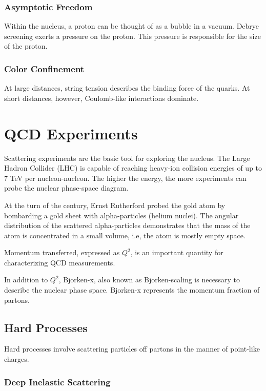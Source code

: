 \subsubsection{Asymptotic Freedom}

Within the nucleus, a proton can be thought of as a bubble in a vacuum. Debrye screening exerts a pressure on the proton. This pressure is responsible for the size of the proton. 

\subsubsection{Color Confinement} 

At large distances, string tension describes the binding force of the quarks. At short distances, however, Coulomb-like interactions dominate.

\section{QCD Experiments}

Scattering experiments are the basic tool for exploring the nucleus. The Large Hadron Collider (LHC) is capable of reaching heavy-ion collision energies of up to 7 TeV per nucleon-nucleon. The higher the energy, the more experiments can probe the nuclear phase-space diagram.

At the turn of the century, Ernst Rutherford probed the gold atom by bombarding a gold sheet with alpha-particles (helium nuclei). The angular distribution of the scattered alpha-particles demonstrates that the mass of the atom is concentrated in a small volume, i.e, the atom is mostly empty space. 

Momentum transferred, expressed as $Q^2$, is an important quantity for characterizing QCD measurements. 

In addition to $Q^2$, Bjorken-x, also known as Bjorken-scaling is necessary to describe the nuclear phase space. Bjorken-x represents the momentum fraction of partons. 

\subsection{Hard Processes}

Hard processes involve scattering particles off partons in the manner of point-like charges.

\subsubsection{Deep Inelastic Scattering}

